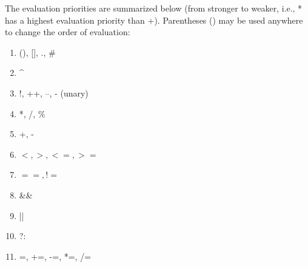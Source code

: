 \documentclass[dvipdfmx, 9pt, a4paper]{article}
\numberwithin{equation}{section}
\begin{document}
The evaluation priorities are summarized below (from stronger to weaker, i.e., * has a highest evaluation priority than +). Parentheses () may be used anywhere to change the order of evaluation:
\begin{enumerate}
\item (), [], ., \#
\item \^{}
\item !, ++, --, - (unary)
\item *, /, \%
\item +, -
\item $<, >, <=, >=$
\item $==, !=$
\item \&\&
\item ||
\item ?:
\item =, +=, -=, *=, /=
\end{enumerate}
\end{document}
